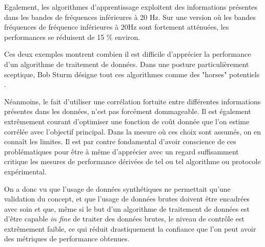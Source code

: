 Egalement, les algorithmes d'apprentissage exploitent des informations présentes dans les bandes de fréquences inférieures à 20 Hz. Sur une version où les bandes fréquences de fréquence inférieures à 20Hz sont fortement atténuées, les performances se réduisent de 15 \% environ.

Ces deux exemples montrent combien il est difficile d'apprécier la performance d'un algorithme de traitement de données. Dans une posture particulièrement sceptique, Bob Sturm désigne tout ces algorithmes comme des "horses" potentiels .

Néanmoins, le fait d'utiliser une corrélation fortuite entre différentes informations présentes dans les données, n'est pas forcément dommageable. Il est également extrêmement courant d'optimiser une fonction de coût donnée que l'on estime corrélée avec l'objectif principal. Dans la mesure où ces choix sont assumés, on en connaît les limites. Il est par contre fondamental d'avoir conscience de ces problématiques pour être à même d'apprécier avec un regard suffisamment critique les mesures de performance dérivées de tel ou tel algorithme ou protocole expérimental\cite{lagrangehal-01635373}.

On a donc vu que l'usage de données synthétiques ne permettait qu'une validation du concept, et que l'usage de données brutes doivent être encadrées avec soin et que, même si le but d'un algorithme de traitement de données est d'être capable \textit{in fine} de traiter des données brutes, le niveau de contrôle est extrêmement faible, ce qui réduit drastiquement la confiance que l'on peut avoir des métriques de performance obtenues.

